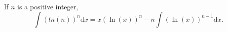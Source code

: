If $n$ is a positive integer,
  $$
  \int (ln(n))^n \mathrm{d}x
  = x(\ln(x))^{n} 
  - n\int(\ln(x))^{n-1} \mathrm{d}x . 
  $$